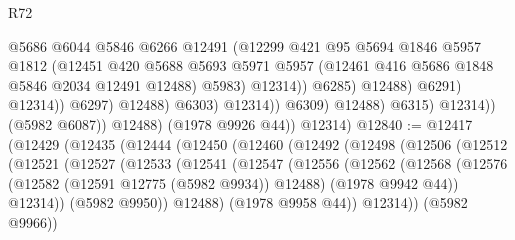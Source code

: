 \begin{lexlean}{R72}
\begin{coremodule}
                                            @5686
                                            @6044
                                            @5846
                                            @6266
                                            @12491
                                            (@12299
                                              @421
                                              @95
                                              @5694
                                              @1846
                                              @5957
                                              @1812
                                              (@12451
                                                @420
                                                @5688
                                                @5693
                                                @5971
                                                @5957
                                                (@12461 @416 @5686 @1848 @5846 @2034 @12491 @12488)
                                                @5983)
                                              @12314))
                                          @6285)
                                        @12488)
                                      @6291)
                                    @12314))
                                @6297)
                              @12488)
                            @6303)
                          @12314))
                      @6309)
                    @12488)
                  @6315)
                @12314))
            (@5982 @6087))
          @12488)
        (@1978 @9926 @44))
      @12314)
@12840 := @12417
    (@12429
      (@12435
        (@12444
          (@12450
            (@12460
              (@12492
                (@12498
                  (@12506
                    (@12512
                      (@12521
                        (@12527
                          (@12533
                            (@12541
                              (@12547
                                (@12556
                                  (@12562
                                    (@12568
                                      (@12576
                                        (@12582 (@12591 @12775 (@5982 @9934)) @12488)
                                        (@1978 @9942 @44))
                                      @12314))
                                  (@5982 @9950))
                                @12488)
                              (@1978 @9958 @44))
                            @12314))
                        (@5982 @9966))

\end{coremodule}
\end{lexlean}
